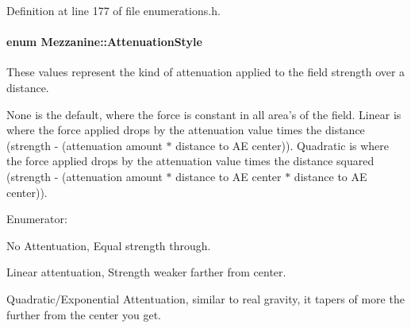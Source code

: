 Definition at line 177 of file enumerations.\-h.

\hypertarget{namespaceMezzanine_a2d10a79e11a2031df10af540eede12fa}{
\paragraph[{Attenuation\-Style}]{\setlength{\rightskip}{0pt plus 5cm}enum {\bf Mezzanine\-::\-Attenuation\-Style}}}\label{namespaceMezzanine_a2d10a79e11a2031df10af540eede12fa}


These values represent the kind of attenuation applied to the field strength over a distance. 

None is the default, where the force is constant in all area's of the field. Linear is where the force applied drops by the attenuation value times the distance (strength -\/ (attenuation amount $\ast$ distance to A\-E center)). Quadratic is where the force applied drops by the attenuation value times the distance squared (strength -\/ (attenuation amount $\ast$ distance to A\-E center $\ast$ distance to A\-E center)). \begin{Desc}
\item[Enumerator\-: ]\par
\begin{description}
\item[{\em 
\hypertarget{namespaceMezzanine_a2d10a79e11a2031df10af540eede12faa548ff9c1d108b12ea6323d39c41856f5}{Att\-\_\-\-None}\label{namespaceMezzanine_a2d10a79e11a2031df10af540eede12faa548ff9c1d108b12ea6323d39c41856f5}
}]No Attentuation, Equal strength through. \item[{\em 
\hypertarget{namespaceMezzanine_a2d10a79e11a2031df10af540eede12faaaecc4b0547a61e5b2abd5401182c9470}{Att\-\_\-\-Linear}\label{namespaceMezzanine_a2d10a79e11a2031df10af540eede12faaaecc4b0547a61e5b2abd5401182c9470}
}]Linear attentuation, Strength weaker farther from center. \item[{\em 
\hypertarget{namespaceMezzanine_a2d10a79e11a2031df10af540eede12faa7f0c2854461a843af7eb21c036375e83}{Att\-\_\-\-Quadratic}\label{namespaceMezzanine_a2d10a79e11a2031df10af540eede12faa7f0c2854461a843af7eb21c036375e83}
}]Quadratic/\-Exponential Attentuation, similar to real gravity, it tapers of more the further from the center you get. \end{description}
\end{Desc}



